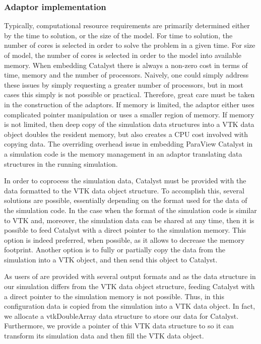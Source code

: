 \subsubsection{Adaptor implementation}
Typically, computational resource requirements are primarily determined either by the time to solution,
or the size of the model. For time to solution, the number of cores is selected in order to solve the problem in a given time. For size of model, the number of cores is selected in order to the model into available memory. 
When embedding Catalyst there is always a non-zero cost in terms of time, memory and the number of processors. Naively, one could simply
address these issues by simply requesting a greater number of processors, but in most cases this simply is
not possible or practical. Therefore, great care must be taken in the construction of the adaptors.
If memory is limited, the adaptor either uses complicated pointer manipulation or uses a smaller region
of memory. If memory is not limited, then deep copy of the simulation data structures into a VTK
data object doubles the resident memory, but also creates a CPU cost involved with copying data.
The overriding overhead issue in embedding ParaView Catalyst in a simulation code is the memory
management in an adaptor translating data structures in the running simulation.

In order to coprocess the simulation data, Catalyst must be provided with the
data formatted to the VTK data object structure. To accomplish this, several
solutions are possible, essentially depending on the format used for the data
of the simulation code. In the case when the format of the simulation code is
similar to VTK  and, moreover, the simulation data can be shared at any time,
then it is possible to feed Catalyst with a direct pointer to the simulation
memory. This option is indeed preferred, when possible, as it allows to decrease the memory footprint.
Another option is to fully or partially copy the data from the
simulation into a VTK object, and then send this object to Catalyst.

As users of \CS are provided with several output formats and as the data
structure in our simulation differs from the VTK data object structure, feeding
Catalyst with a direct pointer to the simulation memory is not possible. Thus, in this configuration
data is copied from the simulation into a VTK data object. In fact, we
 allocate a vtkDoubleArray data structure to store our data for Catalyst. Furthermore, we
provide a pointer of this VTK data structure to \CS so it can transform
its simulation data and then fill the VTK data object.

